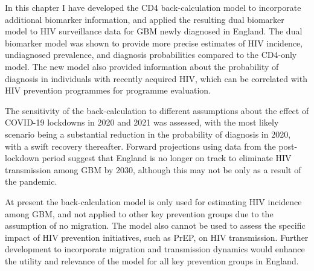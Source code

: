 In this chapter I have developed the CD4 back-calculation model to incorporate additional biomarker information, and applied the resulting dual biomarker model to HIV surveillance data for GBM newly diagnosed in England. The dual biomarker model was shown to provide more precise estimates of HIV incidence, undiagnosed prevalence, and diagnosis probabilities compared to the CD4-only model. The new model also provided information about the probability of diagnosis in individuals with recently acquired HIV, which can be correlated with HIV prevention programmes for programme evaluation.

The sensitivity of the back-calculation to different assumptions about the effect of COVID-19 lockdowns in 2020 and 2021 was assessed, with the most likely scenario being a substantial reduction in the probability of diagnosis in 2020, with a swift recovery thereafter. Forward projections using data from the post-lockdown period suggest that England is no longer on track to eliminate HIV transmission among GBM by 2030, although this may not be only as a result of the pandemic.

At present the back-calculation model is only used for estimating HIV incidence among GBM, and not applied to other key prevention groups due to the assumption of no migration. The model also cannot be used to assess the specific impact of HIV prevention initiatives, such as PrEP, on HIV transmission. Further development to incorporate migration and transmission dynamics would enhance the utility and relevance of the model for all key prevention groups in England.

